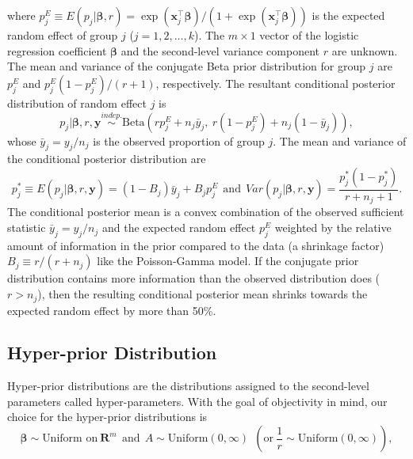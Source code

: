 \documentclass[article]{jss}
\begin{document}
where $p^E_j\equiv E(p_j\vert \boldsymbol{\beta}, r)=\exp(\boldsymbol{x}_j^\top\boldsymbol{\beta})/(1+\exp(\boldsymbol{x}_j^\top\boldsymbol{\beta}))$ is the expected random effect  of group $j$ ($j=1, 2, \ldots, k$). The $m\times 1$ vector of the logistic regression coefficient $\boldsymbol{\beta}$ and the second-level variance component $r$ are unknown. The mean and variance of the conjugate Beta prior distribution for group $j$ are $p^E_j$ and $p^E_j(1-p^E_j)/(r+1)$, respectively.  The resultant conditional posterior distribution of random effect $j$  is
\begin{equation} \label{betapost}
p_{j}\vert  \boldsymbol{\beta}, r, \boldsymbol{y} \stackrel{indep.}{\sim}\textrm{Beta}(rp^E_j+n_{j}\bar{y}_{j},~r(1-p^E_j)+n_{j}(1-\bar{y}_{j})),
\end{equation}
whose $\bar{y}_j=y_j/n_j$ is the observed proportion of group $j$. The mean and variance of the conditional posterior distribution are
\begin{equation}\label{betapost_mean_var}
p_j^\ast\equiv E(p_j\vert \boldsymbol{\beta}, r, \boldsymbol{y} )=(1-B_{j})\bar{y}_{j} + B_{j}p^E_j~~\textrm{and}~~Var(p_j\vert  \boldsymbol{\beta}, r,  \boldsymbol{y})=\frac{p_j^\ast(1-p_j^\ast)}{r+n_j+1}.
\end{equation}
The conditional posterior mean is  a convex combination of the observed sufficient statistic $\bar{y}_{j} = y_j/n_j$ and the expected random effect  $p^E_j$ weighted by the relative amount of information in the prior compared to the data (a shrinkage factor) $B_j\equiv r / (r + n_j)$ like the Poisson-Gamma model.  If the conjugate prior distribution contains more information than the observed distribution does ($r>n_j$), then the resulting conditional posterior mean shrinks towards the expected random effect by more than 50\%.


\subsection[Hyper-prior distributions]{Hyper-prior Distribution}
Hyper-prior distributions are the distributions assigned to the second-level parameters called hyper-parameters. With the goal of objectivity in mind, our choice for the hyper-prior distributions is
\begin{equation}\label{eq:hyper}
\boldsymbol{\beta} \sim \textrm{Uniform on}~ \textbf{R}^{m}~~\textrm{and}~~A \sim \textrm{Uniform}(0, \infty) ~~(\textrm{or} ~\frac{1}{r}\sim \textrm{Uniform}(0, \infty)),
\end{equation}
\end{document}
